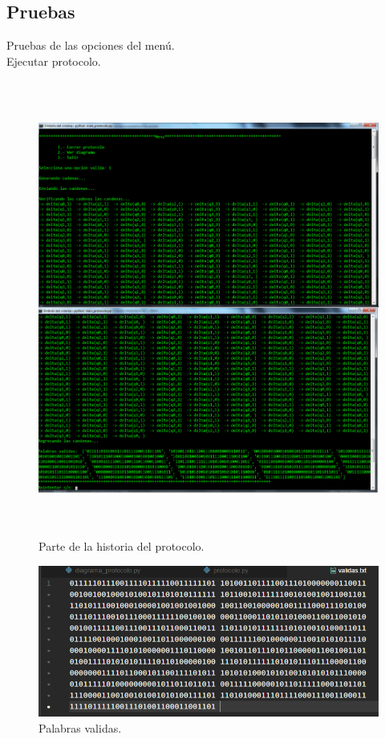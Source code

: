 	\newpage
	\subsection{Pruebas}
	Pruebas de las opciones del menú.
	\\{\large Ejecutar protocolo.}
	\begin{figure}[H]
		\begin{center}
			\includegraphics[width=\linewidth, height=15cm]{img/protocolo-automata.png}
			\caption{Parte de la historia del protocolo. \cite{WEB}}
			\label{fig:protocolo1}
		\end{center}
	\end{figure}
	\begin{figure}[H]
		\begin{center}
			\includegraphics[width=\linewidth, height=5cm]{img/protocolo-salida.png}
			\caption{Palabras validas.\cite{WEB}}
			\label{fig:protocolo2}
		\end{center}
	\end{figure}
